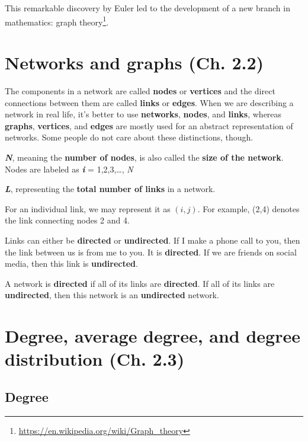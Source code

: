 \documentclass[
]{krantz}
\renewcommand{\href}[2]{#2\footnote{\url{#1}}}
\begin{document}
This remarkable discovery by Euler led to the development of a new branch in mathematics: \href{https://en.wikipedia.org/wiki/Graph_theory}{graph theory}.

\hypertarget{networks-and-graphs-ch.-2.2}{%
\section{Networks and graphs (Ch. 2.2)}\label{networks-and-graphs-ch.-2.2}}

The components in a network are called \textbf{nodes} or \textbf{vertices} and the direct connections between them are called \textbf{links} or \textbf{edges}. When we are describing a network in real life, it's better to use \textbf{networks}, \textbf{nodes}, and \textbf{links}, whereas \textbf{graphs}, \textbf{vertices}, and \textbf{edges} are mostly used for an abstract representation of networks. Some people do not care about these distinctions, though.

\textbf{\emph{N}}, meaning the \textbf{number of nodes}, is also called the \textbf{size of the network}. Nodes are labeled as \textbf{\emph{i}} = 1,2,3,\ldots, \emph{N}

\textbf{\emph{L}}, representing the \textbf{total number of links} in a network.

For an individual link, we may represent it as \((i, j)\). For example, (2,4) denotes the link connecting nodes 2 and 4.

Links can either be \textbf{directed} or \textbf{undirected}. If I make a phone call to you, then the link between us is from me to you. It is \textbf{directed}. If we are friends on social media, then this link is \textbf{undirected}.

A network is \textbf{directed} if all of its links are \textbf{directed}. If all of its links are \textbf{undirected}, then this network is an \textbf{undirected} network.

\hypertarget{degree-average-degree-and-degree-distribution-ch.-2.3}{%
\section{Degree, average degree, and degree distribution (Ch. 2.3)}\label{degree-average-degree-and-degree-distribution-ch.-2.3}}

\hypertarget{degree}{%
\subsection{Degree}\label{degree}}
\end{document}
